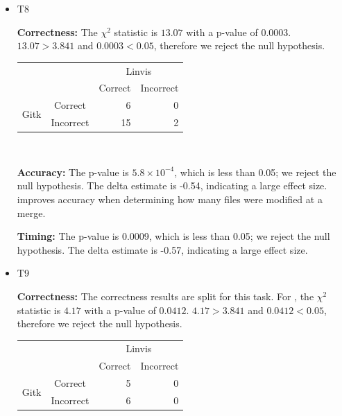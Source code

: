 \begin{itemize}
  \item T8

    \textbf{Correctness:}
    The $\chi^2$ statistic is $13.07$ with a p-value of $0.0003$.
    $13.07 > 3.841$ and $0.0003 < 0.05$, therefore we reject the null
    hypothesis.
    \vspace{2mm}
    \begin{tabular}{cc|rr}
      &           & \multicolumn{2}{c}{Linvis}\\
      &           & Correct                      & Incorrect\\\hline
      \multirow{2}{*}{Gitk} & Correct   & 6                            & 0\\
      & Incorrect & 15                           & 2\\
    \end{tabular}\\
    \vspace{3mm}

    \textbf{Accuracy:} The p-value is $5.8 \times 10^{-4}$, which is
    less than 0.05; we reject the null hypothesis. The delta estimate is
    -0.54, indicating a large effect size. \tool improves accuracy when
    determining how many files were modified at a merge.

    \textbf{Timing:} The p-value is 0.0009, which is less than 0.05; we
    reject the null hypothesis. The delta estimate is -0.57, indicating
    a large effect size.

  \item T9

    \textbf{Correctness:}
    The correctness results are split for this task. For \comA, the
    $\chi^2$ statistic is $4.17$ with a p-value of $0.0412$. $4.17 >
    3.841$ and $0.0412 < 0.05$, therefore we reject the null hypothesis.
    \vspace{2mm}
    \begin{tabular}{cc|rr}
                             &           & \multicolumn{2}{c}{Linvis}\\
                             &           & Correct                      & Incorrect\\\hline
      \multirow{2}{*}{Gitk}  & Correct   & 5                            & 0\\
                             & Incorrect & 6                            & 0\\
    \end{tabular}
    \vspace{3mm}


\end{itemize}
